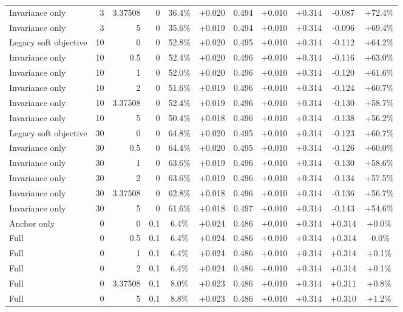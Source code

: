 \begin{table}[htbp]
\begin{tabular}{lrrrccccccc}
Invariance only & 3 & 3.37508 & 0 & 36.4\% & +0.020 & 0.494 & +0.010 & +0.314 & -0.087 & +72.4\% \\
Invariance only & 3 & 5 & 0 & 35.6\% & +0.019 & 0.494 & +0.010 & +0.314 & -0.096 & +69.4\% \\
Legacy soft objective & 10 & 0 & 0 & 52.8\% & +0.020 & 0.495 & +0.010 & +0.314 & -0.112 & +64.2\% \\
Invariance only & 10 & 0.5 & 0 & 52.4\% & +0.020 & 0.496 & +0.010 & +0.314 & -0.116 & +63.0\% \\
Invariance only & 10 & 1 & 0 & 52.0\% & +0.020 & 0.496 & +0.010 & +0.314 & -0.120 & +61.6\% \\
Invariance only & 10 & 2 & 0 & 51.6\% & +0.019 & 0.496 & +0.010 & +0.314 & -0.124 & +60.7\% \\
Invariance only & 10 & 3.37508 & 0 & 52.4\% & +0.019 & 0.496 & +0.010 & +0.314 & -0.130 & +58.7\% \\
Invariance only & 10 & 5 & 0 & 50.4\% & +0.018 & 0.496 & +0.010 & +0.314 & -0.138 & +56.2\% \\
Legacy soft objective & 30 & 0 & 0 & 64.8\% & +0.020 & 0.495 & +0.010 & +0.314 & -0.123 & +60.7\% \\
Invariance only & 30 & 0.5 & 0 & 64.4\% & +0.020 & 0.495 & +0.010 & +0.314 & -0.126 & +60.0\% \\
Invariance only & 30 & 1 & 0 & 63.6\% & +0.019 & 0.496 & +0.010 & +0.314 & -0.130 & +58.6\% \\
Invariance only & 30 & 2 & 0 & 63.6\% & +0.019 & 0.496 & +0.010 & +0.314 & -0.134 & +57.5\% \\
Invariance only & 30 & 3.37508 & 0 & 62.8\% & +0.018 & 0.496 & +0.010 & +0.314 & -0.136 & +56.7\% \\
Invariance only & 30 & 5 & 0 & 61.6\% & +0.018 & 0.497 & +0.010 & +0.314 & -0.143 & +54.6\% \\
Anchor only & 0 & 0 & 0.1 & 6.4\% & +0.024 & 0.486 & +0.010 & +0.314 & +0.314 & +0.0\% \\
Full & 0 & 0.5 & 0.1 & 6.4\% & +0.024 & 0.486 & +0.010 & +0.314 & +0.314 & -0.0\% \\
Full & 0 & 1 & 0.1 & 6.4\% & +0.024 & 0.486 & +0.010 & +0.314 & +0.314 & +0.1\% \\
Full & 0 & 2 & 0.1 & 6.4\% & +0.024 & 0.486 & +0.010 & +0.314 & +0.314 & +0.1\% \\
Full & 0 & 3.37508 & 0.1 & 8.0\% & +0.023 & 0.486 & +0.010 & +0.314 & +0.311 & +0.8\% \\
Full & 0 & 5 & 0.1 & 8.8\% & +0.023 & 0.486 & +0.010 & +0.314 & +0.310 & +1.2\% \\

\end{tabular}
\end{table}
